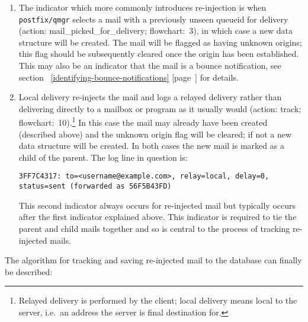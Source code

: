 \documentclass[a4paper,12pt,draft]{article}
\newcommand{\refwithpage}[1]{%
    \empty{}\ref{#1} [page~\pageref{#1}]%
}
\newcommand{\daemon}[1]{%
    \texttt{postfix/#1}%
}
\begin{document}
\begin{enumerate}

    \item The indicator which more commonly introduces re-injection is when
        \daemon{qmgr} selects a mail with a previously unseen
        queueid for delivery (action: mail\_picked\_for\_delivery;
        flowchart:~3), in which case a new data structure will be created.
        The mail will be flagged as having unknown origins; this flag
        should be subsequently cleared once the origin has been
        established.  This may also be an indicator that the mail is a
        bounce notification, see
        section~\refwithpage{identifying-bounce-notifications} for details.

    \item Local delivery re-injects the mail and logs a relayed delivery
        rather than delivering directly to a mailbox or program as it
        usually would (action: track; flowchart:~10).\footnote{Relayed
        delivery is performed by the \SMTP{} client; local delivery means
        local to the server, i.e.\ an address the server is final
        destination for.} In this case the mail may already have been
        created (described above) and the unknown origin flag will be
        cleared; if not a new data structure will be created.  In both
        cases the new mail is marked as a child of the parent.  The log
        line in question is:

        \texttt{3FF7C4317: to=<username@example.com>, relay=local,
        \newline delay=0, status=sent (forwarded as 56F5B43FD)}

        This second indicator always occurs for re-injected mail but
        typically occurs after the first indicator explained above.  This
        indicator is required to tie the parent and child mails together
        and so is central to the process of tracking re-injected mails.

\end{enumerate}

The algorithm for tracking and saving re-injected mail to the database can
finally be described:
\end{document}

